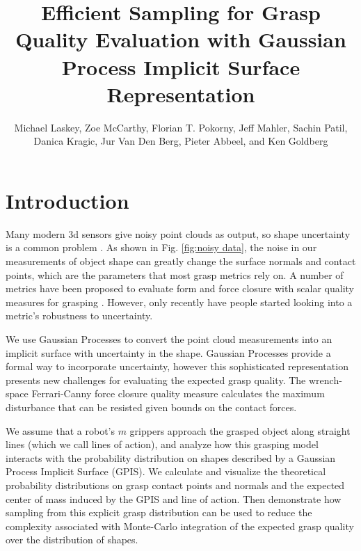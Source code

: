 \documentclass[letterpaper, 10 pt, conference]{ieeeconf}  %
\title{\LARGE \bf
Efficient Sampling for Grasp Quality Evaluation with Gaussian Process Implicit Surface Representation }
\author{Michael Laskey, Zoe McCarthy, Florian T. Pokorny, Jeff Mahler, Sachin Patil,\\ Danica Kragic, Jur Van Den Berg, Pieter Abbeel, and Ken Goldberg}%
\begin{document}
\maketitle
\thispagestyle{empty}
\pagestyle{empty}





\section{Introduction}

\vspace{10pt}

Many modern 3d sensors give noisy point clouds as output, so shape uncertainty is a common problem \cite{singhbigbird}. As shown in Fig. \ref{fig:noisy data}, the noise in our measurements of object shape can greatly change the surface normals and contact points, which are the parameters that most grasp metrics rely on.  A number of metrics have been proposed to evaluate form and force closure with scalar quality measures for grasping \cite{bicchi2000}.   However, only recently have people started looking into a metric's robustness to uncertainty. 
 
We use Gaussian Processes \cite{rasmussen2006} to convert the point cloud measurements into an implicit surface with uncertainty in the shape. Gaussian Processes provide a formal way to incorporate uncertainty, however this sophisticated representation presents new challenges for evaluating the expected grasp quality. The wrench-space Ferrari-Canny force closure quality measure \cite{ferrari1992} calculates the maximum disturbance that can be resisted given bounds on the contact forces.

We assume that a robot's $m$ grippers approach the grasped object along straight lines (which we call lines of action), and analyze how this grasping model interacts with the probability distribution on shapes described by a Gaussian Process Implicit Surface (GPIS).
We calculate and visualize the theoretical probability distributions on grasp contact points and normals and the expected center of mass induced by the GPIS and line of action.
Then demonstrate how sampling from this explicit grasp distribution can be used to reduce the complexity associated with Monte-Carlo integration of the expected grasp quality over the distribution of shapes. 
\end{document}
